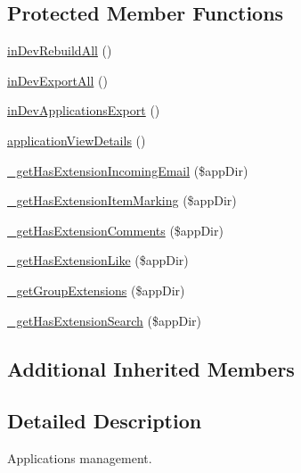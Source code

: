 \subsection*{Protected Member Functions}
\begin{DoxyCompactItemize}
\item 
\hyperlink{classadmin__core__applications__applications_ab41d4e518b53a7c8a9981112517be2d7}{in\-Dev\-Rebuild\-All} ()
\item 
\hyperlink{classadmin__core__applications__applications_aaad674208685165790a1d5ed6aa868fb}{in\-Dev\-Export\-All} ()
\item 
\hyperlink{classadmin__core__applications__applications_a11d2d29ad1f7f02a5fddd9da521b148e}{in\-Dev\-Applications\-Export} ()
\item 
\hyperlink{classadmin__core__applications__applications_a4c7d62e47926310ab72cefaef95a1793}{application\-View\-Details} ()
\item 
\hyperlink{classadmin__core__applications__applications_a5b52d9b44b33d1115775c223394ec36e}{\-\_\-get\-Has\-Extension\-Incoming\-Email} (\$app\-Dir)
\item 
\hyperlink{classadmin__core__applications__applications_ac85d5b0bafce1a854cee1ede4e021533}{\-\_\-get\-Has\-Extension\-Item\-Marking} (\$app\-Dir)
\item 
\hyperlink{classadmin__core__applications__applications_af9a97e6a47fcba59cf943ca3c286f832}{\-\_\-get\-Has\-Extension\-Comments} (\$app\-Dir)
\item 
\hyperlink{classadmin__core__applications__applications_ad8e23ee080141935ce7aa0fb43b18788}{\-\_\-get\-Has\-Extension\-Like} (\$app\-Dir)
\item 
\hyperlink{classadmin__core__applications__applications_a765000c4fe1366a6a8b330c16d76a361}{\-\_\-get\-Group\-Extensions} (\$app\-Dir)
\item 
\hyperlink{classadmin__core__applications__applications_a4a4bdefdf181725ebebd881364e8eee2}{\-\_\-get\-Has\-Extension\-Search} (\$app\-Dir)
\end{DoxyCompactItemize}
\subsection*{Additional Inherited Members}


\subsection{Detailed Description}
Applications management. 

